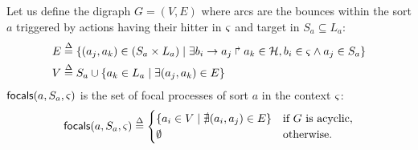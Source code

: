 \begin{comment}
\begin{definition}[$\focals(a,\ctx)$]\label{def:focals}
Let us define the digraph $G = (L_a, E)$ where arcs are the bounces within the sort $a$
triggered by actions having their hitter in $\ctx$ and target in $L_a$:
\[E \DEF \{(a_j,a_k)\in (\PHl_a \times \PHl_a) \mid 
			\exists\PHfrappe{b_i}{a_j}{a_k}\in \PHa(a,\ctx)\}\enspace.\]
$\focals(a,\ctx)$ is the set of focal processes of sort $a$ in the context $\ctx$:
\[
\focals(a,\ctx) \DEF
\begin{cases}
\{ a_i \in \PHl_a \mid \nexists (a_i,a_j)\in E\} & \text{if $G$ is acyclic},\\
\emptyset & \text{otherwise.}\\
\end{cases}
\]
\end{definition}
\end{comment}

\begin{definition}\label{def:focals}
Let us define the digraph $G = (V, E)$ where arcs are the bounces within the sort $a$
triggered by actions having their hitter in $\varsigma$ and target in $S_a\subseteq L_a$:
\begin{align*}
E  & \stackrel{\Delta}= \{(a_j,a_k)\in (S_a \times L_a) \mid 
			\exists b_i\rightarrow a_j\Rsh a_k\in \mathcal{H},
				b_i\in\varsigma \wedge a_j\in S_a \}
\\
V & \stackrel{\Delta}= S_a \cup \{ a_k\in L_a\mid \exists (a_j,a_k)\in E\}
\end{align*}
$\mathsf{focals}(a,S_a,\varsigma)$ is the set of focal processes of sort $a$ in the context $\varsigma$:
\[
\mathsf{focals}(a,S_a,\varsigma) \stackrel{\Delta}=
\begin{cases}
\{ a_i \in V \mid \nexists (a_i,a_j)\in E\} & \text{if $G$ is acyclic},\\
\emptyset & \text{otherwise.}\\
\end{cases}
\]
\end{definition}

